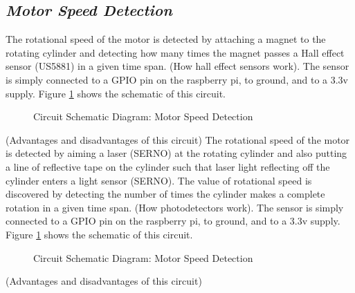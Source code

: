 \documentclass[a4]{report}
\begin{document}
	\subsection{\textit{Motor Speed Detection}}
	The rotational speed of the motor is detected by attaching a magnet to the rotating cylinder and detecting how many times the magnet passes a Hall effect sensor (US5881) in a given time span. (How hall effect sensors work). The sensor is simply connected to a GPIO pin on the raspberry pi, to ground, and to a 3.3v supply. Figure \ref{circhall} shows the schematic of this circuit. \newline
	\begin{figure}[!h]
		\centering
		\caption{Circuit Schematic Diagram: Motor Speed Detection}
		\label{circhall}
	\end{figure} \newline  \noindent
	(Advantages and disadvantages of this circuit) \newline \newline \noindent
	The rotational speed of the motor is detected by aiming a laser (SERNO) at the rotating cylinder and also putting a line of reflective tape on the cylinder such that laser light reflecting off the cylinder enters a light sensor (SERNO). The value of rotational speed is discovered by detecting the number of times the cylinder makes a complete rotation in a given time span. (How photodetectors work). The sensor is simply connected to a GPIO pin on the raspberry pi, to ground, and to a 3.3v supply. Figure \ref{circhall} shows the schematic of this circuit. \newline
	\begin{figure}[!h]
		\centering
		\caption{Circuit Schematic Diagram: Motor Speed Detection}
		\label{circoptical}
	\end{figure} \newline  \noindent
	(Advantages and disadvantages of this circuit) \newline \newline \noindent
\end{document}
